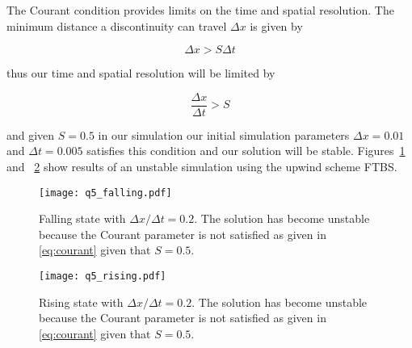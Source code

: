 \documentclass{article}
\begin{document}
\begin{homeworkProblem}

    The Courant condition provides limits on the time and spatial resolution.
    The minimum distance a discontinuity can travel $\Delta x$ is given by

        \begin{equation}
            \Delta x > S \Delta t
        \end{equation}

    thus our time and spatial resolution will be limited by

        \begin{equation}\label{eq:courant}
            \frac{\Delta x}{\Delta t} > S
        \end{equation}

    and given $S = 0.5$ in our simulation our initial simulation parameters
    $\Delta x = 0.01$ and $\Delta t = 0.005$ satisfies this condition and our
    solution will be stable. Figures~\ref{fig:q5_falling} and
    ~\ref{fig:q5_rising} show results of an unstable simulation using the
    upwind scheme FTBS. 
    
    \begin{figure}[!ht]
    \begin{center}
        
        \texttt{[image: q5\_falling.pdf]}

        \caption{\label{fig:q5_falling} Falling state with $\Delta x / \Delta t
        = 0.2$. The solution has become unstable because the Courant parameter
    is not satisfied as given in \ref{eq:courant} given that $S = 0.5$.}

    \end{center}
    \end{figure}

    \begin{figure}[!ht]
    \begin{center}
        
        \texttt{[image: q5\_rising.pdf]}

        \caption{\label{fig:q5_rising} Rising state with $\Delta x / \Delta t
        = 0.2$. The solution has become unstable because the Courant parameter
    is not satisfied as given in \ref{eq:courant} given that $S = 0.5$.}

    \end{center}
    \end{figure}


\end{homeworkProblem} \clearpage
\end{document}

